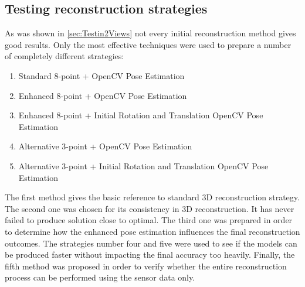 \subsection{Testing reconstruction strategies}
As was shown in \ref{sec:Testin2Views} not every initial reconstruction method gives good results. Only the most effective techniques were used to prepare a number of completely different strategies:
\begin{enumerate}
\item \textnormal{Standard 8-point + OpenCV Pose Estimation} 
\item \textnormal{Enhanced 8-point + OpenCV Pose Estimation} 
\item \textnormal{Enhanced 8-point + Initial Rotation and Translation OpenCV Pose Estimation} 
\item \textnormal{Alternative 3-point + OpenCV Pose Estimation}
\item \textnormal{Alternative 3-point + Initial Rotation and Translation OpenCV Pose Estimation}
\end{enumerate}
The first method gives the basic reference to standard 3D reconstruction strategy. The second one was chosen for its consistency in 3D reconstruction. It has never failed to produce solution close to optimal. The third one was prepared in order to determine how the enhanced pose estimation influences the final reconstruction outcomes. The strategies number four and five were used to see if the models can be produced faster without impacting the final accuracy too heavily. Finally, the fifth method was proposed in order to verify whether the entire reconstruction process can be performed using the sensor data only.

